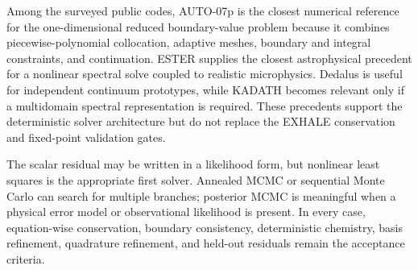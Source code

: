 \documentclass[english,a4paper]{my_memo}
\begin{document}
Among the surveyed public codes, AUTO-07p is the closest numerical reference
for the one-dimensional reduced boundary-value problem because it combines
piecewise-polynomial collocation, adaptive meshes, boundary and integral
constraints, and continuation.  ESTER supplies the closest astrophysical
precedent for a nonlinear spectral solve coupled to realistic microphysics.
Dedalus is useful for independent continuum prototypes, while KADATH becomes
relevant only if a multidomain spectral representation is required.  These
precedents support the deterministic solver architecture but do not replace the
EXHALE conservation and fixed-point validation gates.

The scalar residual may be written in a likelihood form, but nonlinear least
squares is the appropriate first solver.  Annealed MCMC or sequential Monte
Carlo can search for multiple branches; posterior MCMC is meaningful when a
physical error model or observational likelihood is present.  In every case,
equation-wise conservation, boundary consistency, deterministic chemistry,
basis refinement, quadrature refinement, and held-out residuals remain the
acceptance criteria.



\end{document}
